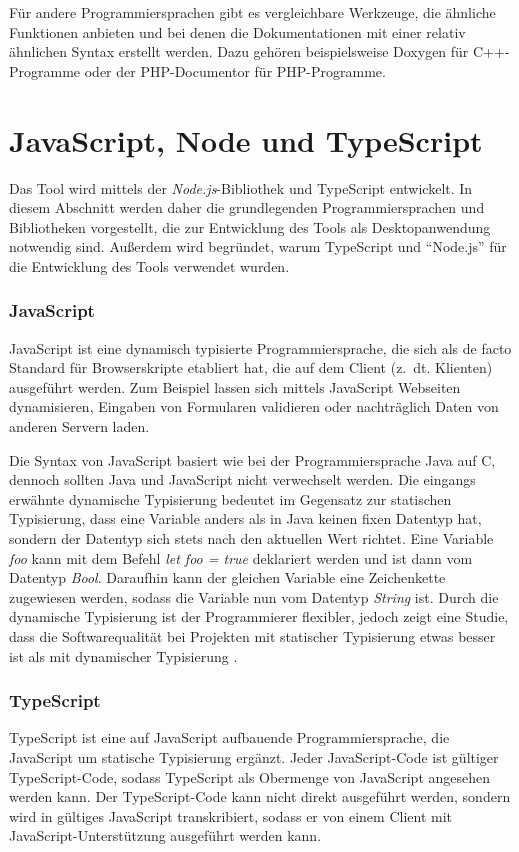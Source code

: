 Für andere Programmiersprachen gibt es vergleichbare Werkzeuge, die ähnliche Funktionen anbieten und bei denen die Dokumentationen mit einer relativ ähnlichen Syntax erstellt werden. Dazu gehören beispielsweise Doxygen für C++-Programme oder der PHP-Documentor für PHP-Programme. 


\section{JavaScript, Node und TypeScript}
Das Tool wird mittels der \textit{Node.js}-Bibliothek und TypeScript entwickelt.
In diesem Abschnitt werden daher die grundlegenden Programmiersprachen und Bibliotheken vorgestellt, die zur Entwicklung des Tools als Desktopanwendung notwendig sind. Außerdem wird begründet, warum TypeScript und \enquote{Node.js} für die Entwicklung des Tools verwendet wurden. 
\subsubsection{JavaScript}
JavaScript ist eine dynamisch typisierte Programmiersprache, die sich als de facto Standard  für Browserskripte etabliert hat, die auf dem Client (z.~dt. Klienten) ausgeführt werden. Zum Beispiel lassen sich mittels JavaScript Webseiten dynamisieren, Eingaben von Formularen validieren oder nachträglich Daten von anderen Servern laden. 

Die Syntax von JavaScript basiert wie bei der Programmiersprache Java auf C, dennoch sollten Java und JavaScript nicht verwechselt werden. Die eingangs erwähnte dynamische Typisierung bedeutet im Gegensatz zur statischen Typisierung, dass eine Variable anders als in Java keinen fixen Datentyp hat, sondern der Datentyp sich stets nach den aktuellen Wert richtet. Eine Variable \textit{foo} kann mit dem Befehl \textit{ let foo = true} deklariert werden und ist dann vom Datentyp \textit{Bool}. Daraufhin kann der gleichen Variable eine Zeichenkette zugewiesen werden, sodass die Variable nun vom Datentyp \textit{String} ist. Durch die dynamische Typisierung ist der Programmierer flexibler, jedoch zeigt eine Studie, dass die Softwarequalität bei Projekten mit statischer Typisierung etwas besser ist als mit dynamischer Typisierung \cite[S. 155ff.]{Ray2014}.

\subsubsection{TypeScript}
TypeScript ist eine auf JavaScript aufbauende Programmiersprache, die JavaScript um statische Typisierung ergänzt. Jeder JavaScript-Code ist gültiger TypeScript-Code, sodass TypeScript als Obermenge von JavaScript angesehen werden kann. Der TypeScript-Code kann nicht direkt ausgeführt werden, sondern wird in gültiges JavaScript transkribiert, sodass er von einem Client mit JavaScript-Unterstützung ausgeführt werden kann. 

